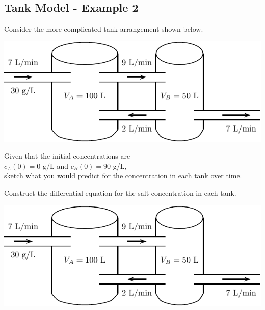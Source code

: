 \newpage

\subsection*{Tank Model - Example 2}

Consider the more complicated tank arrangement shown below.
\begin{center}
\includegraphics[width=0.7\linewidth]{graphics/notes_09_tanks2}
\end{center}
\begin{problem}
Given that the initial concentrations are \\
$c_A(0) = 0 $ g/L and $c_B(0)  = 90$ g/L,  \\
sketch what you would predict for the concentration in each tank over time.
\end{problem}

\newpage
\begin{minipage}[h]{0.5\linewidth}
\vspace{0pt}
\begin{problem}
  Construct the differential equation for the salt concentration in
  each tank.
\end{problem}
\end{minipage} \hfill
\begin{minipage}[h]{0.45\linewidth}
\vspace{0pt}
\includegraphics[width=1.0\linewidth]{graphics/notes_09_tanks2}
\end{minipage}


